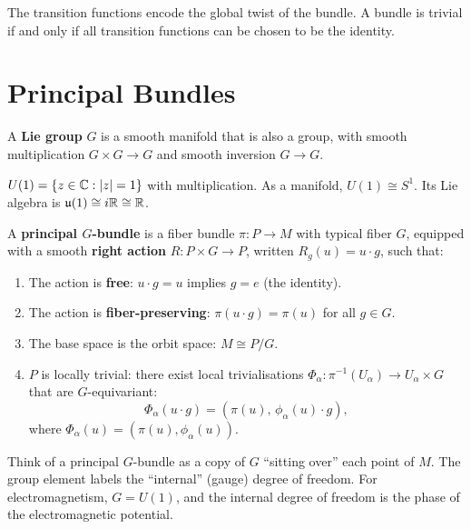 The transition functions encode the global twist of the bundle. A bundle is trivial if and only if all transition functions can be chosen to be the identity.

\section{Principal Bundles}

\begin{definition}
A \textbf{Lie group} $G$ is a smooth manifold that is also a group, with smooth multiplication $G \times G \to G$ and smooth inversion $G \to G$.
\end{definition}

\begin{example}
$U(1) = \{z \in \mathbb{C} : |z| = 1\}$ with multiplication. As a manifold, $U(1) \cong S^1$. Its Lie algebra is $\mathfrak{u}(1) \cong i\mathbb{R} \cong \mathbb{R}$.
\end{example}

\begin{definition}
A \textbf{principal $G$-bundle} is a fiber bundle $\pi: P \to M$ with typical fiber $G$, equipped with a smooth \textbf{right action} $R: P \times G \to P$, written $R_g(u) = u \cdot g$, such that:
\begin{enumerate}
\item The action is \textbf{free}: $u \cdot g = u$ implies $g = e$ (the identity).
\item The action is \textbf{fiber-preserving}: $\pi(u \cdot g) = \pi(u)$ for all $g \in G$.
\item The base space is the orbit space: $M \cong P/G$.
\item $P$ is locally trivial: there exist local trivialisations $\Phi_\alpha: \pi^{-1}(U_\alpha) \to U_\alpha \times G$ that are $G$-equivariant:
\begin{equation}
\Phi_\alpha(u \cdot g) = (\pi(u),\, \phi_\alpha(u) \cdot g),
\end{equation}
where $\Phi_\alpha(u) = (\pi(u), \phi_\alpha(u))$.
\end{enumerate}
\end{definition}

\begin{remark}[Intuition]
Think of a principal $G$-bundle as a copy of $G$ ``sitting over'' each point of $M$. The group element labels the ``internal'' (gauge) degree of freedom. For electromagnetism, $G = U(1)$, and the internal degree of freedom is the phase of the electromagnetic potential.
\end{remark}

